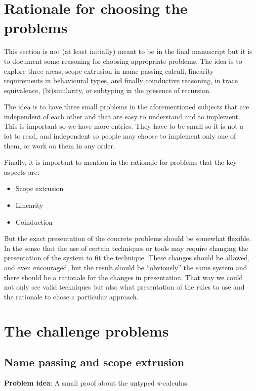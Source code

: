 \documentclass{jfp}
\begin{document}
\section{Rationale for choosing the problems}\label{sec:rationale}

This section is not (at least initially) meant to be in the final
manuscript but it is to document some reasoning for choosing
appropriate problems. The idea is to explore three areas, scope
extrusion in name passing calculi, linearity requirements in
behavioural types, and finally coinductive reasoning, in trace
equivalence, (bi)similarity, or subtyping in the presence of
recursion.

The idea is to have three small problems in the aforementioned
subjects that are independent of each other and that are easy to
understand and to implement. This is important so we have more
entries. They have to be small so it is not a lot to read, and
independent so people may choose to implement only one of them, or
work on them in any order.

Finally, it is important to mention in the rationale for problems that
the key aspects are:
\begin{itemize}
\item Scope extrusion
\item Linearity
\item Coinduction
\end{itemize}

But the exact presentation of the concrete problems should be somewhat
flexible. In the sense that the use of certain techniques or tools may
require changing the presentation of the system to fit the technique.
These changes should be allowed, and even encouraged, but the result
should be ``obviously'' the same system and there should be a
rationale for the changes in presentation. That way we could not only
see valid techniques but also what presentation of the rules to use
and the rationale to chose a particular approach.

\section{The challenge problems} \label{sec:problems}

\subsection{Name passing and scope extrusion}

\textbf{Problem idea}: A small proof about the untyped $\pi$-calculus.
\end{document}
